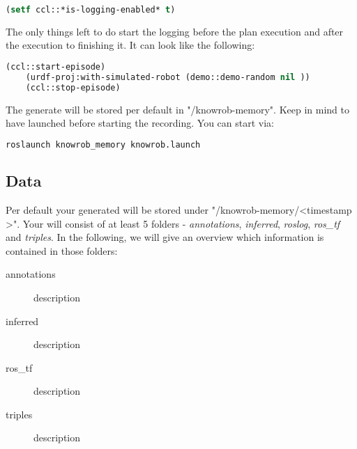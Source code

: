 \begin{lstlisting}[language=lisp, caption=Enabling \neem Logging in a \cram plan]
	(setf ccl::*is-logging-enabled* t)
\end{lstlisting}

The only things left to do start the logging before the plan execution and after the execution to finishing it.
It can look like the following:
\begin{lstlisting}[language=lisp, caption=Steps to Record an Episode for a \cram Plan]
	(ccl::start-episode)
	(urdf-proj:with-simulated-robot (demo::demo-random nil ))
	(ccl::stop-episode)
\end{lstlisting}
	
The generate \neem will be stored per default in "\raisebox{-0.9ex}{\~{}}/knowrob-memory".
Keep in mind to  have \knowrob launched before starting the \neem recording. 
You can start \knowrob via:

\begin{lstlisting}[language=bash, caption=How to Start \knowrob]
	roslaunch knowrob_memory knowrob.launch
\end{lstlisting}

\subsection{Data}
Per default your generated \neem will be stored under "\raisebox{-0.9ex}{\~{}}/knowrob-memory/\textless timestamp \textgreater". 
Your \neem will consist of at least 5 folders - \textit{annotations}, \textit{inferred}, \textit{roslog}, \textit{ros\_tf} and \textit{triples}.
In the following, we will give an overview which information is contained in those folders:

\begin{description}
	\item[annotations] description
	\item[inferred] description
	\item[ros\_tf] description
	\item[triples] description	
\end{description}


